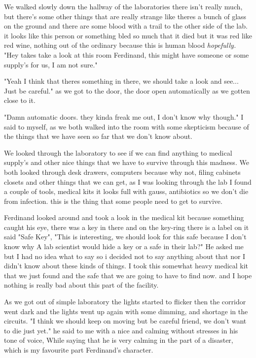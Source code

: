 \documentclass[14pt,letterpaper]{book}
\begin{document}
We walked slowly down the hallway of the laboratories there isn't really much, but there's some other things that are really strange like theres a bunch of glass on the ground and there are some blood with a trail to the other side of the lab. it looks like this person or something bled so much that it died but it was red like red wine, nothing out of the ordinary because this is human blood \textit{hopefully.}
"Hey takes take a look at this room Ferdinand, this might have someone or some supply's for us, I am not sure." 

"Yeah I think that theres something in there, we should take a look and see... Just be careful." as we got to the door, the door open automatically as we gotten close to it.

"Damn automatic doors. they kinda freak me out, I don't know why though." I said to myself, as we both walked into the room with some skepticism because of the things that we have seen so far that we don't know about.

We looked through the laboratory to see if we can find anything to medical supply's and other nice things that we have to survive through this madness. We both looked through desk drawers, computers because why not, filing cabinets closets and other things that we can get, as I was looking through the lab I found a couple of tools, medical kits it looks full with gauss, antibiotics so we don't die from infection. this is the thing that some people need to get to survive.

Ferdinand looked around and took a look in the medical kit because something caught his eye, there was a key in there and on the key-ring there is a label on it said "Safe Key", "This is interesting, we should look for this safe because I don't know why A lab scientist would hide a key or a safe in their lab?" He asked me but I had no idea what to say so i decided not to say anything about that nor I didn't know about these kinds of things. I took this somewhat heavy medical kit that we just found and the safe that we are going to have to find now. and I hope nothing is really bad about this part of the facility.


As we got out of simple laboratory the lights started to flicker then the corridor went dark and the lights went up again with some dimming, and shortage in the circuits. "I think we should keep on moving but be careful friend, we don't want to die just yet." he said to me with a nice and calming without stresses in his tone of voice, While saying that he is very calming in the part of a disaster, which is my favourite part Ferdinand's character.
\end{document}
